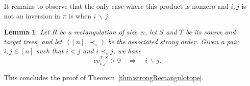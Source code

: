 \documentclass{amsart}
\newtheorem{lemma}[theorem]{Lemma}
\theoremstyle{definition}
\begin{document}
It remains to observe that the only case where this product is nonzero and $i,j$ is not an inversion in $\pi$ is when $i \, \backslash \, j$.

\begin{lemma}
  Let $R$ be a rectangulation of size~$n$, let $S$ and $T$ be its source and target trees, and let~$([n],\prec_s)$ be the associated strong order.
  Given a pair $i,j\in [n]$ such that $i<j$ and $i\prec_s j$, we have
  \[
    cv^{T,S}_{i,j} > 0 \quad \Longrightarrow \quad i \, \backslash \, j.
  \]
\end{lemma}

This concludes the proof of Theorem~\ref{thm:strongRectangulotope}.


{}


\label{sec:biblio}
\end{document}
